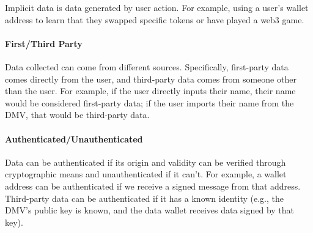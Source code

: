 Implicit data is data generated by user action. For example, using a user's wallet address to learn that they swapped specific tokens or have played a web3 game. 


\paragraph{First/Third Party}
Data collected can come from different sources. Specifically, first-party data comes directly from the user, and third-party data comes from someone other than the user. For example, if the user directly inputs their name, their name would be considered first-party data; if the user imports their name from the DMV, that would be third-party data.


\paragraph{Authenticated/Unauthenticated}
Data can be authenticated if its origin and validity can be verified through cryptographic means and unauthenticated if it can't. For example, a wallet address can be authenticated if we receive a signed message from that address. Third-party data can be authenticated if it has a known identity (e.g., the DMV's public key is known, and the data wallet receives data signed by that key). 



